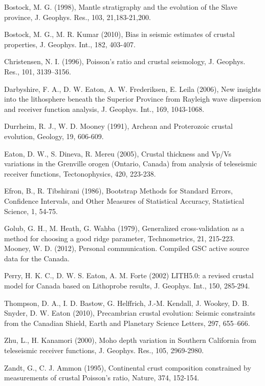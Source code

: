 \documentclass[draft, 12pt]{article}
\begin{document}
\begin{bibliography}
Bostock, M. G. (1998), Mantle stratigraphy and the evolution of the Slave province, J. Geophys. Res., 103, 21,183-21,200.

Bostock, M. G., M. R. Kumar (2010), Bias in seismic estimates of crustal properties, J. Geophys. Int., 182, 403-407.

Christensen, N. I. (1996), Poisson's ratio and crustal seismology, J. Geophys. Res., 101, 3139–3156.

Darbyshire, F. A., D. W. Eaton, A. W. Frederiksen, E. Leila (2006), New insights into the lithosphere beneath the Superior Province from Rayleigh wave dispersion and receiver function analysis, J. Geophys. Int., 169, 1043-1068.

Durrheim, R. J., W. D. Mooney (1991), Archean and Proterozoic crustal evolution, Geology, 19, 606-609.

Eaton, D. W., S. Dineva, R. Mereu (2005), Crustal thickness and Vp/Vs variations in the Grenville orogen (Ontario, Canada) from analysis of teleseismic receiver functions, Tectonophysics, 420, 223-238.

Efron, B., R. Tibshirani (1986), Bootstrap Methods for Standard Errors, Confidence Intervals, and Other Measures of Statistical Accuracy, Statistical Science, 1, 54-75.

Golub, G. H., M. Heath, G. Wahba (1979), Generalized cross-validation as a method for choosing a good ridge parameter, Technometrics, 21, 215-223.
Mooney, W. D. (2012), Personal communication. Compiled GSC active source data for the Canada.

Perry, H. K. C., D. W. S. Eaton, A. M. Forte (2002) LITH5.0: a revised crustal model for Canada based on Lithoprobe results,  J. Geophys. Int., 150, 285-294.

Thompson, D. A., I. D. Bastow, G. Helffrich, J.-M. Kendall, J. Wookey, D. B. Snyder, D. W. Eaton (2010), Precambrian crustal evolution: Seismic constraints from the Canadian Shield, Earth and Planetary Science Letters, 297, 655–666.

Zhu, L., H. Kanamori (2000), Moho depth variation in Southern California from teleseismic receiver functions, J. Geophys. Res., 105, 2969-2980.

Zandt, G., C. J. Ammon (1995), Continental crust composition constrained by measurements of crustal Poisson's ratio, Nature, 374, 152-154.

\end{bibliography}
\end{document}
